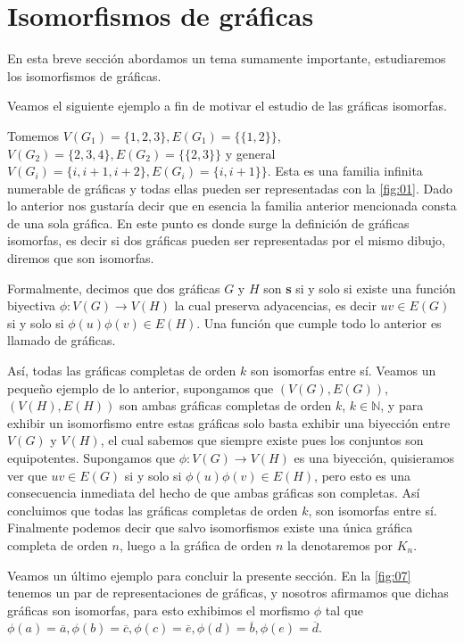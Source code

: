 \section{Isomorfismos de gráficas}
\label{sec:Isomorfismos}
En esta breve sección abordamos un tema sumamente importante, estudiaremos los isomorfismos de gráficas.

Veamos el siguiente ejemplo a fin de motivar el estudio de las gráficas isomorfas.

Tomemos $V(G_1)=\{ 1,2,3\}, E(G_1)=\{ \{1,2\} \}$, $V(G_2)=\{2,3,4 \}, E(G_2)=\{ \{2,3\} \}$ y general $V(G_i)=\{ i, i+1,i+2\}, E(G_i)=\{ i,i+1\} \}$.
Esta es una familia infinita numerable de gráficas y todas ellas pueden ser representadas con la \cref{fig:01}.
Dado lo anterior nos gustaría decir que en esencia la familia anterior mencionada consta de una sola gráfica. En este punto es donde surge la definición de gráficas isomorfas, es decir si dos gráficas pueden ser representadas por el mismo dibujo, diremos que son isomorfas. 

Formalmente, decimos que dos gráficas $G$ y $H$ son \textbf{s} si y solo si existe una función biyectiva $\phi \colon V(G) \to V(H)$ la cual preserva adyacencias, es decir $uv\in E(G)$ si y solo si $\phi(u)\phi(v)\in E(H)$. Una función que cumple todo lo anterior es llamado  de gráficas.

Así, todas las gráficas completas de orden $k$ son isomorfas entre sí.
Veamos un pequeño ejemplo de lo anterior, supongamos que $(V(G),E(G))$, $(V(H),E(H))$ son ambas gráficas completas de orden $k$, $k\in \mathbb{N}$, y para exhibir un isomorfismo entre estas gráficas solo basta exhibir una biyección entre $V(G)$ y $V(H)$, el cual sabemos que siempre existe pues los conjuntos son equipotentes.
Supongamos que $\phi: V(G) \longrightarrow V(H)$ es una biyección, quisieramos ver que $uv\in E(G)$ si y solo si $\phi(u)\phi(v)\in E(H)$, pero esto es una consecuencia inmediata del hecho de que ambas gráficas son completas.
Así concluimos que todas las gráficas completas de orden $k$, son isomorfas entre sí. Finalmente podemos decir que salvo isomorfismos existe una única gráfica completa de orden $n$, luego a la gráfica de orden $n$ la denotaremos por $K_n$.

Veamos un último ejemplo para concluir la presente sección.
En la \cref{fig:07} tenemos un par de representaciones de gráficas, y nosotros afirmamos que dichas gráficas son isomorfas, para esto exhibimos el morfismo $\phi$ tal que 
$\phi(a)=\overline{a}, \phi(b)=\overline{c}, \phi(c)=\overline{e}, \phi(d)=\overline{b}, \phi(e)=\overline{d} $.

